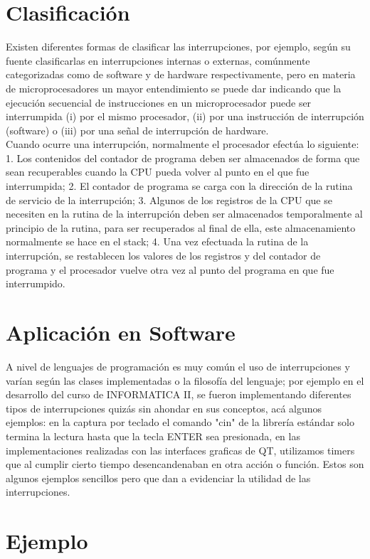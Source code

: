\documentclass[]{article}
\begin{document}
\begin{multicols}{2}
	\section{Clasificación}
		Existen diferentes formas de clasificar las interrupciones, por ejemplo, según su fuente clasificarlas en interrupciones internas o externas, comúnmente categorizadas como de software y de hardware respectivamente\cite{mym}, pero en materia de microprocesadores un mayor entendimiento se puede dar indicando que la ejecución secuencial de instrucciones en un microprocesador puede ser interrumpida (i) por el mismo procesador, (ii) por una instrucción de interrupción (software) o (iii) por una señal de interrupción de hardware\cite{pcbased}.\\
		Cuando ocurre una interrupción, normalmente el procesador efectúa lo siguiente: 1. Los contenidos del contador de programa deben ser almacenados de forma que sean recuperables cuando la CPU pueda volver al punto en el que fue interrumpida; 2. El contador de programa se carga con la dirección de la rutina de servicio de la interrupción; 3. Algunos de los registros de la CPU que se necesiten en la rutina de la interrupción deben ser almacenados temporalmente al principio de la rutina, para ser recuperados al final de ella, este almacenamiento normalmente se hace en el stack; 4. Una vez efectuada la rutina de la interrupción, se restablecen los valores de los registros y del contador de programa y el procesador vuelve otra vez al punto del programa en que fue interrumpido\cite{edymicrop}.
	\section{Aplicación en Software}
		A nivel de lenguajes de programación es muy común el uso de interrupciones y varían según las clases implementadas o la filosofía del lenguaje; por ejemplo en el desarrollo del curso de INFORMATICA II, se fueron implementando diferentes tipos de interrupciones quizás sin ahondar en sus conceptos, acá algunos ejemplos: en la captura por teclado el comando "cin" de la librería estándar solo termina la lectura hasta que la tecla ENTER sea presionada, en las implementaciones realizadas con las interfaces graficas de QT, utilizamos timers que al cumplir cierto tiempo desencandenaban en otra acción o función. Estos son algunos ejemplos sencillos pero que dan a evidenciar la utilidad de las interrupciones.
	\section{Ejemplo}
\end{multicols}
\end{document}
